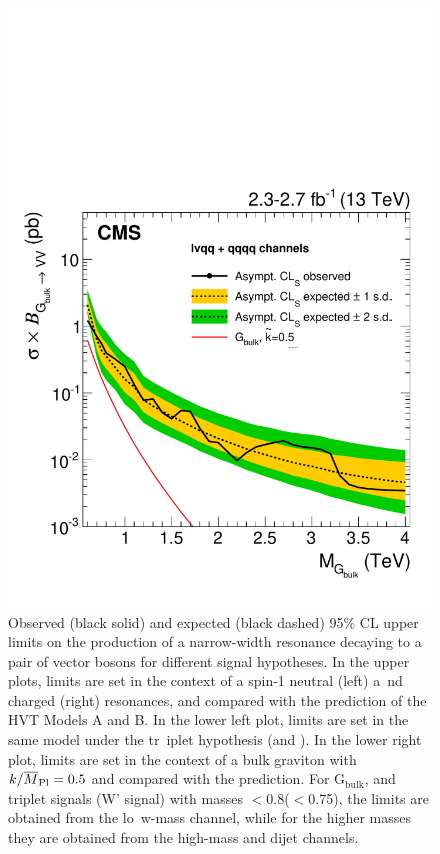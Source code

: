 \begin{figure}[!htb]
     \includegraphics[width=\cmsFigWidth]{B2G-16-004/Figure_006-d.pdf}
\caption{Observed (black solid) and expected (black dashed) 95\% CL upper limits on the production of a narrow-width resonance decaying to
a pair of vector bosons for different signal hypotheses. In the upper plots, limits are set in the context of a spin-1 neutral \PZpr (left) a\
nd charged \PWpr (right)
resonances, and compared with the prediction of the HVT Models A and B. In the lower left plot, limits are set in the same model under the tr\
iplet hypothesis (\PWpr and \PZpr).
In the lower right plot, limits are set in the context of a bulk graviton with $k/\overline{M}_\mathrm{Pl} =0.5$ and compared with the prediction.
For $\mathrm{G}_\text{bulk}$, \PZpr and triplet signals (W' signal) with masses $<$0.8\TeV ($<$0.75\TeV), the limits are obtained from the lo\
w-mass \lnujet channel, while for the higher masses they are obtained from the high-mass \lnujet and dijet channels.
}
\label{fig:limitCombined}
\end{figure}


